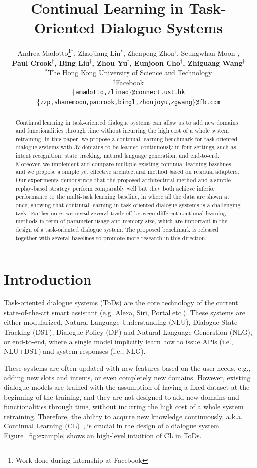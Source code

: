 \documentclass[11pt,a4paper]{article}
\title{Continual Learning in Task-Oriented Dialogue Systems}
\author{Andrea Madotto\thanks{\quad Work done during internship at Facebook}$^*$, Zhaojiang Lin$^*$, Zhenpeng Zhou$^\dagger$, Seungwhan Moon$^\dagger$,\\ \textbf{Paul Crook$^\dagger$, Bing Liu$^\dagger$, Zhou Yu$^\dagger$, Eunjoon Cho$^\dagger$, Zhiguang Wang$^\dagger$}\\
  $^*$The Hong Kong University of Science and Technology \\
  $^\dagger$Facebook \\
  \{\texttt{amadotto,zlinao}\}\texttt{@connect.ust.hk}\\
  \{\texttt{zzp,shanemoon,pacrook,bingl,zhoujoyu,zgwang}\}\texttt{@fb.com}\\
  }
\date{}
\begin{document}
\maketitle
\begin{abstract}
Continual learning in task-oriented dialogue systems can allow us to add new domains and functionalities through time without incurring the high cost of a whole system retraining. In this paper, we propose a continual learning benchmark for task-oriented dialogue systems with 37 domains to be learned continuously in four settings, such as intent recognition, state tracking, natural language generation, and end-to-end. Moreover, we implement and compare multiple existing continual learning baselines, and we propose a simple yet effective architectural method based on residual adapters. Our experiments demonstrate that the proposed architectural method and a simple replay-based strategy perform comparably well but they both achieve inferior performance to the multi-task learning baseline, in where all the data are shown at once, showing that continual learning in task-oriented dialogue systems is a challenging task. Furthermore, we reveal several trade-off between different continual learning methods in term of parameter usage and memory size, which are important in the design of a task-oriented dialogue system. The proposed benchmark is released together with several baselines to promote more research in this direction. 
\end{abstract}



\section{Introduction}
Task-oriented dialogue systems (ToDs) are the core technology of the current state-of-the-art smart assistant (e.g. Alexa, Siri, Portal etc.). These systems are either modularized, Natural Language Understanding (NLU), Dialogue State Tracking (DST), Dialogue Policy (DP) and Natural Language Generation (NLG), or end-to-end, where a single model implicitly learn how to issue APIs (i.e., NLU+DST) and system responses (i.e., NLG). 

These systems are often updated with new features based on the user needs, e.g., adding new slots and intents, or even completely new domains. However, existing dialogue models are trained with the assumption of having a fixed dataset at the beginning of the training, and they are not designed to add new domains and functionalities through time, without incurring the high cost of a whole system retraining. Therefore, the ability to acquire new knowledge continuously, a.k.a. Continual Learning (CL)~\cite{thrun2012learning}, is crucial in the design of a dialogue system. Figure~\ref{fig:example} shows an high-level intuition of CL in ToDs.  
\end{document}
